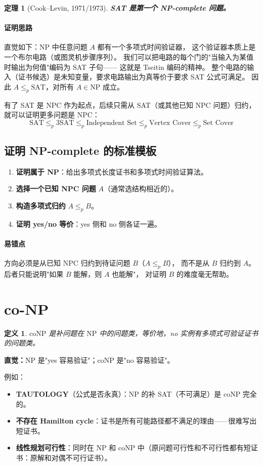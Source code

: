 \documentclass[UTF8,openany,12pt]{ctexbook}
\newtheorem{definition}{定义}[chapter]
\newtheorem{theorem}{定理}[chapter]
\theoremstyle{remark}
\newcommand{\proofidea}[1]{\paragraph{证明思路}#1}
\newcommand{\pitfall}[1]{\paragraph{易错点}#1}
\newcommand{\NP}{\mathrm{NP}}
\newcommand{\coNP}{\mathrm{coNP}}
\begin{document}
\begin{theorem}[Cook--Levin, 1971/1973]
\textbf{SAT 是第一个 NP-complete 问题。}
\end{theorem}

\proofidea{
直觉如下：$\NP$ 中任意问题 $A$ 都有一个多项式时间验证器，
这个验证器本质上是一个布尔电路（或图灵机步骤序列）。
我们可以把电路的每个门的"当输入为某值时输出为何值"编码为 SAT 子句——
这就是 Tseitin 编码的精神。
整个电路的输入（证书候选）是未知变量，要求电路输出为真等价于要求 SAT 公式可满足。
因此 $A \le_p \text{SAT}$，对所有 $A \in \NP$ 成立。
}

有了 SAT 是 NPC 作为起点，后续只需从 SAT（或其他已知 NPC 问题）归约，
就可以证明更多问题是 NPC：
\[
  \text{SAT} \le_p \text{3SAT} \le_p \text{Independent Set} \le_p \text{Vertex Cover} \le_p \text{Set Cover}
\]

\subsection{证明 NP-complete 的标准模板}

\begin{enumerate}
  \item \textbf{证明属于 NP}：给出多项式长度证书和多项式时间验证算法。
  \item \textbf{选择一个已知 NPC 问题} $A$（通常选结构相近的）。
  \item \textbf{构造多项式归约} $A \le_p B$。
  \item \textbf{证明 yes/no 等价}：yes 侧和 no 侧各证一遍。
\end{enumerate}

\pitfall{方向必须是从已知 NPC 归约到待证问题 $B$（$A \le_p B$），
而不是从 $B$ 归约到 $A$。后者只能说明"如果 $B$ 能解，则 $A$ 也能解"，
对证明 $B$ 的难度毫无帮助。}

\section{co-NP}

\begin{definition}
$\coNP$ 是补问题在 $\NP$ 中的问题类，等价地，no 实例有多项式可验证证书的问题类。
\end{definition}

\textbf{直觉：}$\NP$ 是"yes 容易验证"；$\coNP$ 是"no 容易验证"。

例如：
\begin{itemize}
  \item \textbf{TAUTOLOGY}（公式是否永真）：$\NP$ 的补 SAT（不可满足）是 $\coNP$ 完全的。
  \item \textbf{不存在 Hamilton cycle}：证书是所有可能路径都不满足的理由——很难写出短证书。
  \item \textbf{线性规划可行性}：同时在 $\NP$ 和 $\coNP$ 中（原问题可行性和不可行性都有短证书：原解和对偶不可行证书）。
\end{itemize}
\end{document}

